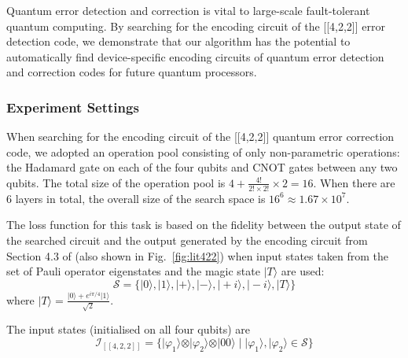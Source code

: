 \documentclass[a4paper,onecolumn,11pt]{quantumarticle}
\begin{document}
Quantum error detection and correction is vital to large-scale fault-tolerant quantum computing. By searching for the encoding circuit of the [[4,2,2]] error detection code, we demonstrate that our algorithm has the potential to automatically find  device-specific encoding circuits of quantum error detection and correction codes for future quantum processors.

\subsubsection{Experiment Settings}
When searching for the encoding circuit of the [[4,2,2]] quantum error correction code, we adopted an operation pool consisting of only non-parametric operations: the Hadamard gate on each of the four qubits and CNOT gates between any two qubits. The total size of the operation pool is $4 + \frac{4!}{2!\times2!}\times2=16$. When there are 6 layers in total, the overall size of the search space is $16^6\approx1.67\times10^7$.

The loss function for this task is based on the fidelity between the output state of the searched circuit and the output generated by the encoding circuit from Section 4.3 of \cite{qec_intro_guide} (also shown in Fig.~\ref{fig:lit422}) when input states taken from the set of Pauli operator eigenstates and the magic state $\vert T \rangle$ are used:
\begin{equation}
    \mathcal{S}=\{\vert 0 \rangle, \vert 1 \rangle, \vert + \rangle, \vert - \rangle, \vert +i \rangle, \vert -i \rangle, \vert T \rangle\}
\end{equation}
where $\vert T \rangle = \frac{\vert 0 \rangle + e^{i\pi/4}\vert 1 \rangle}{\sqrt{2}}$.





The input states (initialised on all four qubits) are
\begin{equation}
    \mathcal{I}_{[[4,2,2]]} = \{\vert \varphi_1 \rangle \otimes \vert \varphi_2 \rangle\otimes\vert 00\rangle \; \vert \; \vert \varphi_1 \rangle, \vert \varphi_2 \rangle \in \mathcal{S}\}
\end{equation}
\end{document}
